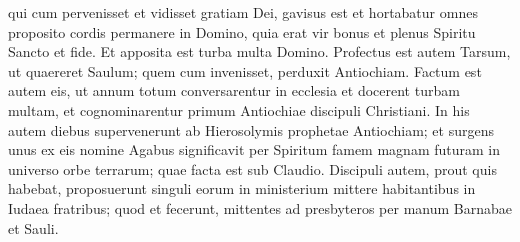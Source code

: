 \begin{biblechapter}
\begin{biblechapter}
\begin{biblechapter}
\begin{biblechapter}
\begin{biblechapter}
\begin{biblechapter}
\begin{biblechapter}
\begin{biblechapter}
\begin{biblechapter}
\begin{biblechapter}
\begin{biblechapter}
\verse qui cum pervenisset et vidisset gratiam Dei, gavisus est et hortabatur omnes proposito cordis permanere in Domino, 
\verse quia erat vir bonus et plenus Spiritu Sancto et fide. Et apposita est turba multa Domino. 
\verse Profectus est autem Tarsum, ut quaereret Saulum; 
\verse quem cum invenisset, perduxit Antiochiam. Factum est autem eis, ut annum totum conversarentur in ecclesia et docerent turbam multam, et cognominarentur primum Antiochiae discipuli Christiani.
 \verse In his autem diebus supervenerunt ab Hierosolymis prophetae Antiochiam; 
 \verse et surgens unus ex eis nomine Agabus significavit per Spiritum famem magnam futuram in universo orbe terrarum; quae facta est sub Claudio. 
\verse Discipuli autem, prout quis habebat, proposuerunt singuli eorum in ministerium mittere habitantibus in Iudaea fratribus; 
\verse quod et fecerunt, mittentes ad presbyteros per manum Barnabae et Sauli.
 

\end{biblechapter}
\end{biblechapter}
\end{biblechapter}
\end{biblechapter}
\end{biblechapter}
\end{biblechapter}
\end{biblechapter}
\end{biblechapter}
\end{biblechapter}
\end{biblechapter}
\end{biblechapter}
